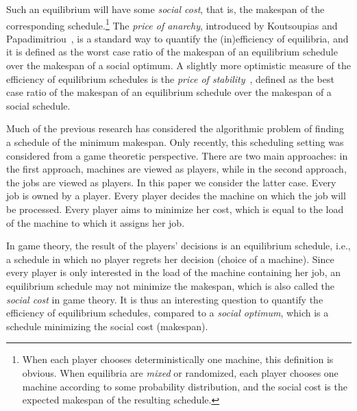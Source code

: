 \documentclass[runningheads]{llncs}
\begin{document}
 
Such an equilibrium will have some \emph{social cost}, that is, the makespan of the corresponding schedule.\footnote{When each player chooses deterministically one machine, this definition is obvious. When equilibria are \emph{mixed} or randomized, each player chooses one machine according to some probability distribution, and the social cost is the expected makespan of the resulting schedule.} The \emph{price of anarchy}, introduced by Koutsoupias and Papadimitriou~\cite{PoAoriginal}, is a standard way to quantify the (in)efficiency of equilibria, and it is defined as the worst case ratio of the makespan of an equilibrium schedule over the makespan of a social optimum. 
%
A slightly more optimistic measure of the efficiency of equilibrium schedules is the \emph{price of stability}~\cite{PoSoriginal}, defined as the best case ratio of the makespan of an equilibrium schedule over the makespan of a social schedule.

 
%
%

Much of the previous research has considered the algorithmic problem of finding a schedule of the minimum makespan.
%
Only recently, this scheduling setting was considered from a game theoretic perspective. There are two main approaches: in the first approach, machines are viewed as players, while in the second approach, the jobs are viewed as players. 
%
In this paper we consider the latter case. 
%
%
Every job is owned by a player. Every player decides the machine on which the job will be processed. 
%
Every player aims to minimize her cost, which is equal to the load of the machine to which it assigns her job.
%

In game theory, the result of the players' decisions is an equilibrium schedule, i.e., a schedule in which no player regrets her decision (choice of a machine). 
%
Since every player is only interested in the load of the machine containing her job, an equilibrium schedule may not minimize the makespan, which is also called the \emph{social cost} in game theory. 
%
It is thus an interesting question to quantify the efficiency of equilibrium schedules, compared to a \emph{social optimum}, which is a schedule minimizing the social cost (makespan).
\end{document}
